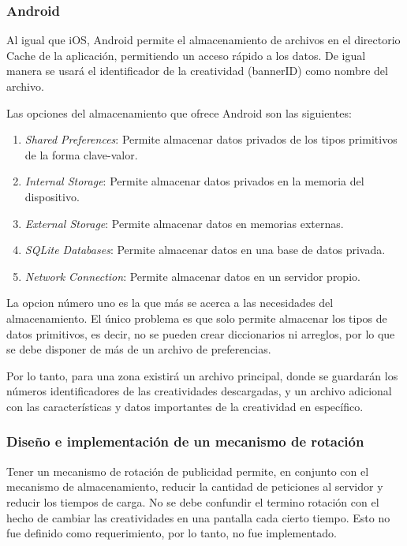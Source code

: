 \subsubsection*{Android}

Al igual que iOS, Android permite el almacenamiento de archivos en
el directorio Cache de la aplicación, permitiendo un acceso rápido
a los datos. De igual manera se usará el identificador de la creatividad
(bannerID) como nombre del archivo.

Las opciones del almacenamiento que ofrece Android son las siguientes:
\begin{enumerate}
\item \textit{Shared Preferences}: Permite almacenar datos privados de los
tipos primitivos de la forma clave-valor.
\item \textit{Internal Storage}: Permite almacenar datos privados en la
memoria del dispositivo.
\item \textit{External Storage}: Permite almacenar datos en memorias externas.
\item \textit{SQLite Databases}: Permite almacenar datos en una base de
datos privada.
\item \textit{Network Connection}: Permite almacenar datos en un servidor
propio.
\end{enumerate}
La opcion número uno es la que más se acerca a las necesidades del
almacenamiento. El único problema es que solo permite almacenar los
tipos de datos primitivos, es decir, no se pueden crear diccionarios
ni arreglos, por lo que se debe disponer de más de un archivo de preferencias. 

Por lo tanto, para una zona existirá un archivo principal, donde se
guardarán los números identificadores de las creatividades descargadas,
y un archivo adicional con las características y datos importantes
de la creatividad en específico.


\subsubsection{Diseño e implementación de un mecanismo de rotación}

Tener un mecanismo de rotación de publicidad permite, en conjunto
con el mecanismo de almacenamiento, reducir la cantidad de peticiones
al servidor y reducir los tiempos de carga. No se debe confundir el
termino rotación con el hecho de cambiar las creatividades en una
pantalla cada cierto tiempo. Esto no fue definido como requerimiento,
por lo tanto, no fue implementado. 

